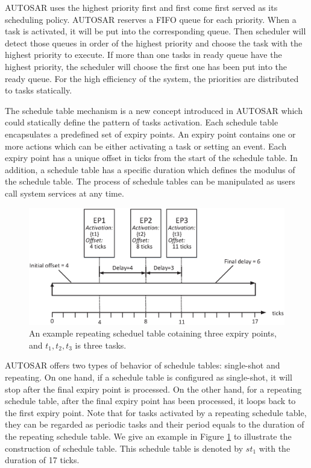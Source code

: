 \documentclass[conference]{IEEEtran}
\begin{document}
AUTOSAR uses the highest priority first and first come first served as its scheduling policy. AUTOSAR reserves a FIFO queue for each priority. When a task is activated, it will be put into the corresponding queue. Then scheduler will detect those queues in order of the highest priority and choose the task with the highest priority to execute. If more than one tasks in ready queue have the highest priority, the scheduler will choose the first one has been put into the ready queue. For the high efficiency of the system, the priorities are distributed to tasks statically.

The schedule table mechanism is a new concept introduced in AUTOSAR which could statically define the pattern of tasks activation. Each schedule table encapsulates a predefined set of expiry points. An expiry point contains one or more actions which can be either activating a task or setting an event. Each expiry point has a unique offset in ticks from the start of the schedule table. In addition, a schedule table has a specific duration which defines the modulus of the schedule table. The process of schedule tables can be manipulated as users call system services at any time.
\begin{figure}[t]
  \centering
  \includegraphics[scale=.32]{graphics/figure_st1.eps}
  \caption{An example repeating scheduel table cotaining three expiry points, and $t_1,t_2,t_3$ is three tasks.}
  \label{figure_st1}
\end{figure}
AUTOSAR offers two types of behavior of schedule tables: single-shot and repeating. On one hand, if a schedule table is configured as single-shot, it will stop after the final expiry point is processed. On the other hand, for a repeating schedule table, after the final expiry point has been processed, it loops back to the first expiry point. Note that for tasks activated by a repeating schedule table, they can be regarded as periodic tasks and their period equals to the duration of the repeating schedule table. We give an example in Figure \ref{figure_st1} to illustrate the construction of schedule table. This schedule table is denoted by $st_1$ with the duration of 17 ticks.
\end{document}

